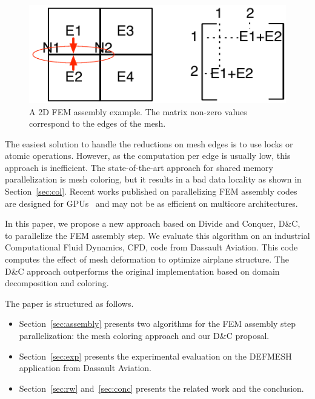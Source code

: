 \documentclass[10pt]{IOS-Book-Article}
\begin{document}
\begin{figure}[tp]
 \includegraphics[scale=0.6]{FEM_ass.pdf}
 \caption{A 2D FEM assembly example. The matrix non-zero values correspond to the edges of the mesh.}
 \label{fig:2Dasm}
\end{figure}

The easiest solution to handle the reductions on mesh edges is to use locks or atomic operations.
However, as the computation per edge is usually low, this approach is inefficient.
The state-of-the-art approach for shared memory parallelization is mesh coloring, but it results in a bad data locality as shown in Section~\ref{sec:col}. Recent works published on parallelizing FEM assembly codes are designed for GPUs~\cite{cecka2011assembly,CPUGPUasm}
and may not be as efficient on multicore architectures.


In this paper, we propose a new approach based on Divide and Conquer, D\&C, to parallelize the FEM assembly step.
We evaluate this algorithm on an industrial Computational Fluid Dynamics, CFD, code from Dassault Aviation.
This code computes the effect of mesh deformation to optimize airplane structure.
The D\&C approach outperforms the original implementation based on domain decomposition and coloring.

The paper is structured as follows.
\begin{itemize}
\item Section~\ref{sec:assembly} presents  two algorithms for the FEM assembly step parallelization: the mesh coloring approach and our D\&C proposal.
\item Section~\ref{sec:exp} presents the experimental evaluation on the DEFMESH application from Dassault Aviation.
\item Section~\ref{sec:rw} and~\ref{sec:conc} presents the related work and the conclusion.
\end{itemize}

\end{document}
